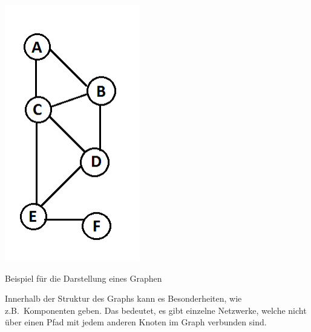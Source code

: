 \begin{dsafigure}
	\begin{center}
	\includegraphics[width=0.9\columnwidth]{img/graph1.png}
	\caption{Beispiel für die Darstellung eines Graphen \parencite[vgl.]{Kleinberg-2009-oz}}
	\label{fig:graph1}
	\end{center}
\end{dsafigure}

Innerhalb der Struktur des Graphs kann es Besonderheiten, wie z.B.\ Komponenten geben.
Das bedeutet, es gibt einzelne Netzwerke, welche nicht über einen Pfad mit jedem anderen Knoten im Graph verbunden sind.

